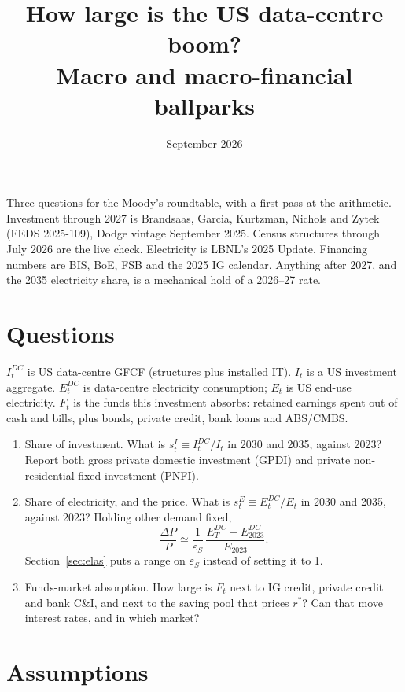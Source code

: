 \documentclass[11pt]{article}
\title{How large is the US data-centre boom?\\
\large Macro and macro-financial ballparks}
\author{}
\date{September 2026}
\begin{document}
\maketitle

\noindent
Three questions for the Moody's roundtable, with a first pass at the arithmetic.
Investment through 2027 is Brandsaas, Garcia, Kurtzman, Nichols and Zytek
(FEDS 2025-109), Dodge vintage September 2025. Census structures through July
2026 are the live check. Electricity is LBNL's 2025 Update. Financing numbers
are BIS, BoE, FSB and the 2025 IG calendar. Anything after 2027, and the 2035
electricity share, is a mechanical hold of a 2026--27 rate.

\section{Questions}

$I_t^{DC}$ is US data-centre GFCF (structures plus installed IT). $I_t$ is a US
investment aggregate. $E_t^{DC}$ is data-centre electricity consumption; $E_t$
is US end-use electricity. $F_t$ is the funds this investment absorbs: retained
earnings spent out of cash and bills, plus bonds, private credit, bank loans
and ABS/CMBS.

\begin{enumerate}
\item Share of investment. What is $s_t^I \equiv I_t^{DC}/I_t$ in 2030 and
2035, against 2023? Report both gross private domestic investment (GPDI) and
private non-residential fixed investment (PNFI).

\item Share of electricity, and the price. What is
$s_t^E \equiv E_t^{DC}/E_t$ in 2030 and 2035, against 2023? Holding other
demand fixed,
\begin{equation}
\frac{\Delta P}{P}
\simeq
\frac{1}{\varepsilon_S}\,
\frac{E_T^{DC}-E_{2023}^{DC}}{E_{2023}}.
\label{eq:price}
\end{equation}
Section~\ref{sec:elas} puts a range on $\varepsilon_S$ instead of setting it
to 1.

\item Funds-market absorption. How large is $F_t$ next to IG credit, private
credit and bank C\&I, and next to the saving pool that prices $r^*$? Can that
move interest rates, and in which market?
\end{enumerate}

\section{Assumptions}
\end{document}
